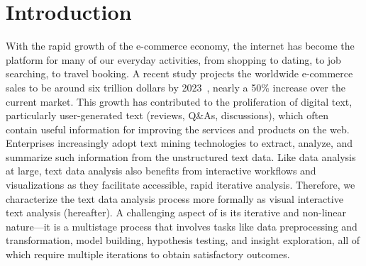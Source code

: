 \section{Introduction}\label{sec:intro}

With the rapid  growth of the e-commerce economy, the internet has become the platform for many of our everyday activities, from shopping to dating, to job searching, to travel booking.  A recent study projects the worldwide e-commerce sales to be around six trillion dollars by 2023~\cite{ecommerce}, nearly a 50\% increase over the current market. This growth has contributed to the proliferation of digital text, particularly user-generated text (reviews, Q\&As, discussions), which often contain useful information for improving the services and products on the web. Enterprises increasingly adopt text mining technologies to extract, analyze, and summarize such information from the unstructured text data.
Like data analysis at large, text data analysis also benefits from interactive workflows and visualizations as they facilitate accessible, rapid iterative analysis. Therefore, we characterize the text data analysis process more formally as visual interactive text analysis (\vita hereafter). A challenging aspect of \vita is its iterative and non-linear nature---it is a multistage process that involves tasks like data preprocessing and transformation, model building, hypothesis testing,
and insight exploration, all of which require multiple iterations to obtain satisfactory outcomes.

